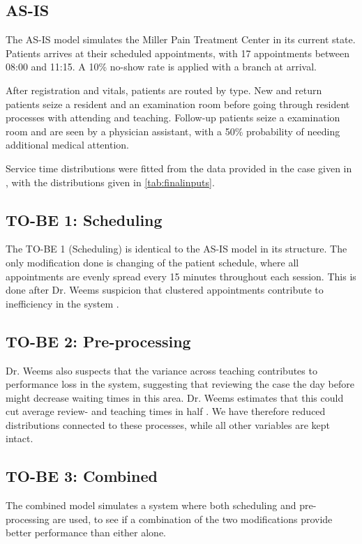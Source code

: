 \subsection{AS-IS}

The AS-IS model simulates the Miller Pain Treatment Center in its current state. Patients arrives at their scheduled appointments, with 17 appointments between 08:00 and 11:15. A 10\% no-show rate is applied with a branch at arrival.

After registration and vitals, patients are routed by type. New and return patients seize a resident and an examination room before going through resident processes with attending and teaching. Follow-up patients seize a examination room and are seen by a physician assistant, with a 50\% probability of needing additional medical attention. 

Service time distributions were fitted from the data provided in the case given in \cite{MillerPainTreatmentCenter}, with the distributions given in \autoref{tab:finalinputs}.

\subsection{TO-BE 1: Scheduling}

The TO-BE 1 (Scheduling) is identical to the AS-IS model in its structure. The only modification done is changing of the patient schedule, where all appointments are evenly spread every 15 minutes throughout each session. This is done after Dr. Weems suspicion that clustered appointments contribute to inefficiency in the system \parencite{MillerPainTreatmentCenter}.

\subsection{TO-BE 2: Pre-processing}

Dr. Weems also suspects that the variance across teaching contributes to performance loss in the system, suggesting that reviewing the case the day before might decrease waiting times in this area. Dr. Weems estimates that this could cut average review- and teaching times in half \parencite{MillerPainTreatmentCenter}. We have therefore reduced distributions connected to these processes, while all other variables are kept intact.

\subsection{TO-BE 3: Combined}

The combined model simulates a system where both scheduling and pre-processing are used, to see if a combination of the two modifications provide better performance than either alone.